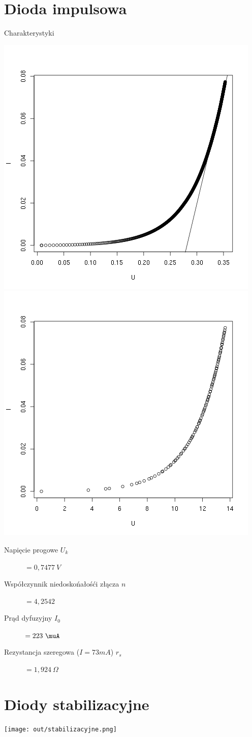 \documentclass[11pt]{article}
\begin{document}
\section{Dioda impulsowa}
Charakterystyki 
\begin{center}
\includegraphics[scale=0.48]{out/germanowa-normal.png}
\includegraphics[scale=0.48]{out/germanowa-log.png}
\end{center}
\begin{description}
\item[Napięcie progowe $U_k$] $=0,7477\ V$
\item[Współczynnik niedoskońałośći złącza $n$]  $=4,2542$
\item[Prąd dyfuzyjny $I_0$ ] $=223\ \muA$
\item[Rezystancja szeregowa ($I=73mA$) $r_s$ ] $=1,924\ \Omega$
\end{description}

\section{Diody stabilizacyjne}
\texttt{[image: out/stabilizacyjne.png]}
\end{document}
